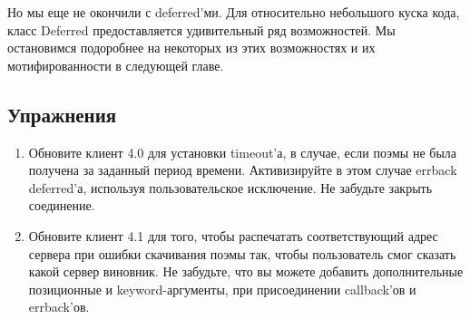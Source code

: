 Но мы еще не окончили с deferred'ми. Для относительно 
небольшого куска кода, класс Deferred предоставляется 
удивительный ряд возможностей. Мы остановимся подоробнее 
на некоторых из этих возможностях и их мотифированности в 
следующей главе.


\subsection{Упражнения}

\begin{enumerate}

\item Обновите клиент 4.0 для установки timeout'а, в случае, если 
поэмы не была получена за заданный период времени. Активизируйте в этом 
случае errback deferred'а, используя пользовательское исключение. Не 
забудьте закрыть соединение.

\item Обновите клиент 4.1 для того, чтобы распечатать 
соответствующий адрес сервера при ошибки скачивания поэмы так, 
чтобы пользователь смог сказать какой сервер виновник. Не забудьте, 
что вы можете добавить дополнительные позиционные и keyword-аргументы, 
при присоединении callback'ов и errback'ов.

\end{enumerate}

